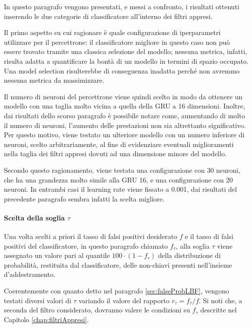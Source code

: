 \documentclass[../../main.tex]{subfiles}
\begin{document}
    In questo paragrafo vengono presentati, e messi a confronto, i risultati ottenuti inserendo le due categorie di classificatore all'interno dei filtri appresi.

    Il primo aspetto su cui ragionare è quale configurazione di iperparametri utilizzare per il percettrone: il classificatore migliore in questo caso non può essere trovato tramite una classica selezione del modello; nessuna metrica, infatti, risulta adatta a quantificare la bontà di un modello in termini di spazio occupato. Una model selection risulterebbe di conseguenza inadatta perché non avremmo nessuna metrica da massimizzare.

    Il numero di neuroni del percettrone viene quindi scelto in modo da ottenere un modello con una taglia molto vicina a quella della GRU a 16 dimensioni. Inoltre, dai risultati dello scorso paragrafo è possibile notare come, aumentando di molto il numero di neuroni, l'aumento delle prestazioni non sia altrettanto significativo. Per questo motivo, viene testato un ulteriore modello con un numero inferiore di neuroni, scelto arbitrariamente, al fine di evidenziare eventuali miglioramenti nella taglia dei filtri appresi dovuti ad una dimensione minore del modello.

    Secondo questo ragionamento, viene testata una configurazione con 30 neuroni, che ha una grandezza molto simile alla GRU 16, e una configurazione con 20 neuroni. In entrambi casi il learning rate viene fissato a 0.001, dai risultati del precedente paragrafo sembra infatti la scelta migliore.
    
    \paragraph{Scelta della soglia $\tau$}
    Una volta scelti a priori il tasso di falsi positivi desiderato $f$ e il tasso di falsi positivi del classificatore, in questo paragrafo chiamato $f_{\tau}$, alla soglia $\tau$ viene assegnato un valore pari al quantile $100 \cdot (1 - f_{\tau})$ della distribuzione di probabilità, restituita dal classificatore, delle non-chiavi presenti nell'insieme d'addestramento.

    Coerentemente con quanto detto nel paragrafo \ref{sec:falseProbLBF}, vengono testati diversi valori di $\tau$ variando il valore del rapporto $r_{\tau} = f_{\tau}/f$. Si noti che, a seconda  del filtro considerato, dovranno valere le condizioni su $f_{\tau}$ descritte nel Capitolo \ref{chap:filtriAppresi}.
\end{document}
